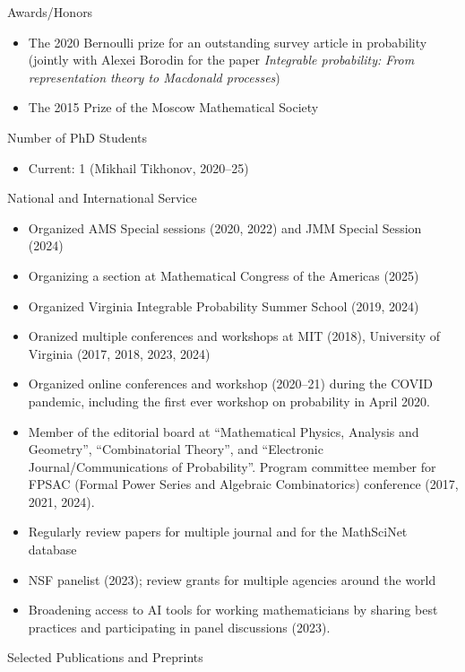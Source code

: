 \documentclass{amsart}
\begin{document}
\bigskip\noindent
{\sc Awards/Honors}

\begin{itemize}
\item The 2020 Bernoulli prize for an outstanding survey article in probability 
(jointly with Alexei Borodin for the paper \emph{Integrable probability: From representation theory to
Macdonald processes})
\item The 2015 Prize of the Moscow Mathematical Society
\end{itemize}

\bigskip\noindent
{\sc Number of PhD Students}

\begin{itemize}
\item Current: 1 (Mikhail Tikhonov, 2020--25)
\end{itemize}


\bigskip\noindent
{\sc National and International Service}

\begin{itemize}
\item Organized AMS Special sessions (2020, 2022) and JMM Special Session (2024)
\item Organizing a section at Mathematical Congress of the Americas (2025)
\item Organized Virginia Integrable Probability Summer School (2019, 2024)
\item Oranized multiple conferences and workshops at MIT (2018), University of Virginia (2017, 2018, 2023, 2024)
\item Organized online conferences and workshop (2020--21) during the COVID pandemic, including the first ever workshop on probability in April 2020.
\item Member of the editorial board at 
	``Mathematical Physics, Analysis and Geometry'', ``Combinatorial Theory'', and ``Electronic Journal/Communications of Probability''. Program committee member for FPSAC (Formal Power Series and Algebraic Combinatorics) conference (2017, 2021, 2024).
\item Regularly review papers for multiple journal and for the MathSciNet database
\item NSF panelist (2023); review grants for multiple agencies around the world
\item Broadening access to AI tools for working mathematicians by sharing best practices and participating in panel discussions (2023). 
\end{itemize}


\bigskip\noindent
{\sc Selected Publications and Preprints}
\end{document}
